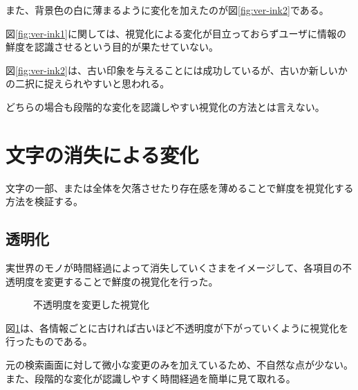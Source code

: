 また、背景色の白に薄まるように変化を加えたのが図\ref{fig:ver-ink2}である。

図\ref{fig:ver-ink1}に関しては、視覚化による変化が目立っておらずユーザに情報の鮮度を認識させるという目的が果たせていない。

図\ref{fig:ver-ink2}は、古い印象を与えることには成功しているが、古いか新しいかの二択に捉えられやすいと思われる。

どちらの場合も段階的な変化を認識しやすい視覚化の方法とは言えない。

\section{文字の消失による変化}
\label{sec:ver-character}

文字の一部、または全体を欠落させたり存在感を薄めることで鮮度を視覚化する方法を検証する。

\subsection{透明化}
\label{subsec:ver-chr-trp}

実世界のモノが時間経過によって消失していくさまをイメージして、各項目の不透明度を変更することで鮮度の視覚化を行った。

\begin{figure}[htbp]
  \begin{center}
  \end{center}
  \caption{不透明度を変更した視覚化}
  \label{fig:ver-transparence}
\end{figure}

図\ref{fig:ver-transparence}は、各情報ごとに古ければ古いほど不透明度が下がっていくように視覚化を行ったものである。

元の検索画面に対して微小な変更のみを加えているため、不自然な点が少ない。また、段階的な変化が認識しやすく時間経過を簡単に見て取れる。

